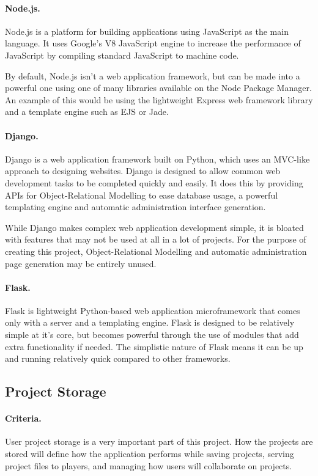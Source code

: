 \paragraph{Node.js.}
Node.js is a platform for building applications using JavaScript as the main language. It uses Google's V8 JavaScript engine to increase the performance of JavaScript by compiling standard JavaScript to machine code.\cite{nodejs}

By default, Node.js isn't a web application framework, but can be made into a powerful one using one of many libraries available on the Node Package Manager.\cite{npmjs} An example of this would be using the lightweight Express web framework library and a template engine such as EJS or Jade.

\paragraph{Django.}
Django is a web application framework built on Python, which uses an MVC-like approach to designing websites.\cite{django} Django is designed to allow common web development tasks to be completed quickly and easily. It does this by providing APIs for Object-Relational Modelling to ease database usage, a powerful templating engine and automatic administration interface generation.\cite{djangooverview}

While Django makes complex web application development simple, it is bloated with features that may not be used at all in a lot of projects. For the purpose of creating this project, Object-Relational Modelling and automatic administration page generation may be entirely unused. 

\paragraph{Flask.}
Flask is lightweight Python-based web application microframework that comes only with a server and a templating engine. Flask is designed to be relatively simple at it's core, but becomes powerful through the use of modules that add extra functionality if needed.\cite{flask} The simplistic nature of Flask means it can be up and running relatively quick compared to other frameworks.

\subsection{Project Storage}
\paragraph{Criteria.}
User project storage is a very important part of this project. How the projects are stored will define how the application performs while saving projects, serving project files to players, and managing how users will collaborate on projects.

